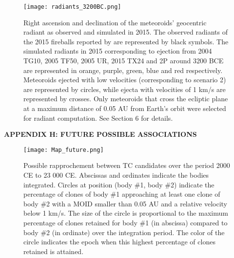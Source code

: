 \documentclass[a4paper,11pt]{article}
\begin{document}
\begin{figure*}[!ht]
  \centering
  \texttt{[image: radiants\_3200BC.png]}
  \caption{Right ascension and declination of the meteoroids' geocentric radiant as observed and simulated in 2015. The observed radiants of the 2015 fireballs reported by \protect\cite{Spurny2017} are represented by black symbols. The simulated radiants in 2015 corresponding to ejection from 2004 TG10, 2005 TF50, 2005 UR, 2015 TX24 and 2P around 3200 BCE are represented in orange, purple, green, blue and red respectively. Meteoroids ejected with low velocities (corresponding to scenario 2) are represented by circles, while ejecta with velocities of 1 km/s are represented by crosses. Only meteoroids that cross the ecliptic plane at a maximum distance of 0.05 AU from Earth's orbit were selected for radiant computation. See Section 6 for details.}
  \label{fig:radiants}
\end{figure*}

\clearpage
\newpage
\textbf{APPENDIX H: FUTURE POSSIBLE ASSOCIATIONS} \label{sec:future}\\


\begin{figure}[!ht]
  \centering
  \texttt{[image: Map\_future.png]}
  \caption{Possible rapprochement between TC candidates over the period 2000 CE to 23 000 CE. Abscissas and ordinates indicate the bodies integrated. Circles at position (body \#1, body \#2) indicate the percentage of clones of body \#1 approaching at least one clone of body \#2 with a MOID smaller than 0.05 AU and a relative velocity below 1 km/s. The size of the circle is proportional to the maximum percentage of clones retained for body \#1 (in abscissa) compared to body \#2 (in ordinate) over the integration period. The color of the circle indicates the epoch when this highest percentage of clones retained is attained.}
  \label{fig:map_future}
\end{figure}

\newpage

\end{document}
